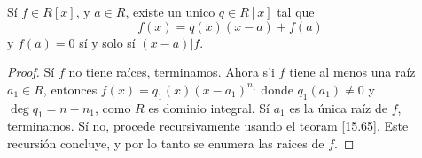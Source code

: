 \begin{theorem}\label{15.66}
    S\'i $f \in R[x]$, y $a \in R$, existe un unico $q \in R[x]$ tal que
    \begin{equation*}
        f(x)=q(x)(x-a)+f(a)
    \end{equation*}
    y $f(a)=0$ s\'i y solo s\'i $(x-a)|f$.
\end{theorem}
\begin{proof}
    S\'i $f$ no tiene ra\'ices, terminamos. Ahora s'i $f$ tiene al menos una
    ra\'iz  $a_1 \in R$, entonces $f(x)=q_1(x)(x-a_1)^{n_1}$ donde $q_1(a_1)
    \neq 0$ y $\deg{q_1}=n-n_1$, como $R$ es dominio integral. S\'i $a_1$ es la
    \'unica ra\'iz de $f$, terminamos. S\'i no, procede recursivamente usando el
    teoram \ref {15.65}. Este recursi\'on concluye, y por lo tanto se enumera
    las raices de $f$.
\end{proof}

